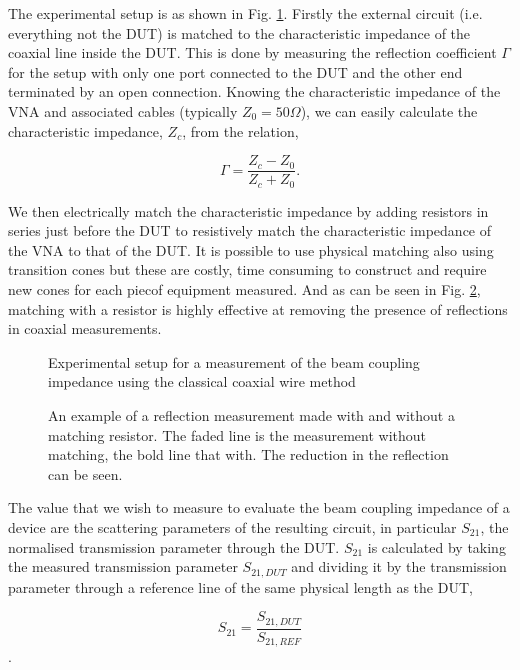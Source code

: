 The experimental setup is as shown in Fig. \ref{fig:classic-coax}. Firstly the external circuit (i.e. everything not the DUT) is matched to the characteristic impedance of the coaxial line inside the DUT. This is done by measuring the reflection coefficient $\Gamma$ for the setup with only one port connected to the DUT and the other end terminated by an open connection. Knowing the characteristic impedance of the VNA and associated cables (typically $Z_{0} = 50\Omega$), we can easily calculate the characteristic impedance, $Z_{c}$, from the relation,

\begin{equation}
\Gamma = \frac{Z_{c} - Z_{0}}{Z_{c} + Z_{0}}.
\end{equation}

We then electrically match the characteristic impedance by adding resistors in series just before the DUT to resistively match the characteristic impedance of the VNA to that of the DUT. It is possible to use physical matching also using transition cones but these are costly, time consuming to construct and require new cones for each piecof equipment measured. And as can be seen in Fig. \ref{fig:matching-plot}, matching with a resistor is highly effective at removing the presence of reflections in coaxial measurements.

\begin{figure}

\caption{Experimental setup for a measurement of the beam coupling impedance using the classical coaxial wire method}
\label{fig:classic-coax}
\end{figure} 

\begin{figure}

\caption{An example of a reflection measurement made with and without a matching resistor. The faded line is the measurement without matching, the bold line that with. The reduction in the reflection can be seen.}
\label{fig:matching-plot}
\end{figure}

The value that we wish to measure to evaluate the beam coupling impedance of a device are the scattering parameters of the resulting circuit, in particular $S_{21}$, the normalised transmission parameter through the DUT. $S_{21}$ is calculated by taking the measured transmission parameter $S_{21,DUT}$ and dividing it by the transmission parameter through a reference line of the same physical length as the DUT,

\begin{equation}
S_{21} = \frac{S_{21,DUT}}{S_{21,REF}}
\end{equation}.

